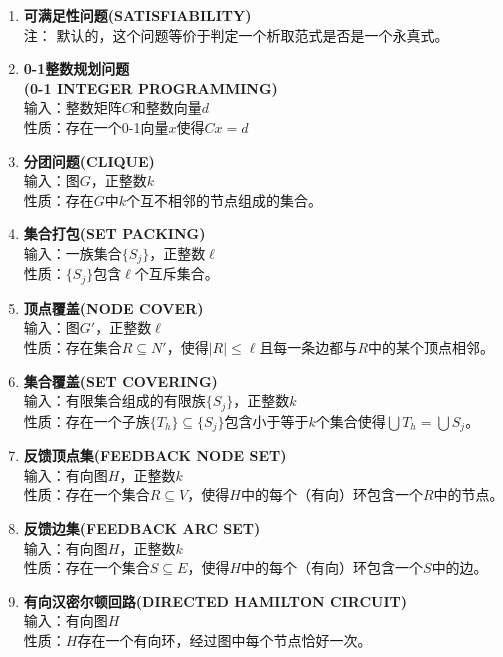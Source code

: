 \documentclass[twocolumn]{article}
\theoremstyle{nonumberplain}%
\begin{document}
    \begin{enumerate}
    \item {\bf 可满足性问题(SATISFIABILITY)}\\
    注： 默认的，这个问题等价于判定一个析取范式是否是一个永真式。

    \item {\bf 0-1整数规划问题\\(0-1 INTEGER PROGRAMMING)}\\
    输入：整数矩阵$C$和整数向量$d$\\
    性质：存在一个0-1向量$x$使得$Cx=d$

    \item {\bf 分团问题(CLIQUE)}\\
    输入：图$G$，正整数$k$\\
    性质：存在$G$中$k$个互不相邻的节点组成的集合。

    \item {\bf 集合打包(SET PACKING)}\\
    输入：一族集合$\{S_j\}$，正整数$\ell$\\
    性质：$\{S_j\}$包含$\ell$个互斥集合。

    \item {\bf 顶点覆盖(NODE COVER)}\\
    输入：图$G'$，正整数$\ell$\\
    性质：存在集合$R\subseteq N'$，使得$|R|\leq\ell$且每一条边都与$R$中的某个顶点相邻。

    \item {\bf 集合覆盖(SET COVERING)}\\
    输入：有限集合组成的有限族$\{S_j\}$，正整数$k$\\
    性质：存在一个子族$\{T_h\}\subseteq\{S_j\}$包含小于等于$k$个集合使得$\bigcup T_h=\bigcup S_j$。

    \item {\bf 反馈顶点集(FEEDBACK NODE SET)}\\
    输入：有向图$H$，正整数$k$\\
    性质：存在一个集合$R\subseteq V$，使得$H$中的每个（有向）环包含一个$R$中的节点。

    \item {\bf 反馈边集(FEEDBACK ARC SET)}\\
    输入：有向图$H$，正整数$k$\\
    性质：存在一个集合$S\subseteq E$，使得$H$中的每个（有向）环包含一个$S$中的边。

    \item {\bf 有向汉密尔顿回路(DIRECTED HAMILTON CIRCUIT)}\\
    输入：有向图$H$\\
    性质：$H$存在一个有向环，经过图中每个节点恰好一次。


\end{enumerate}
\end{document}
